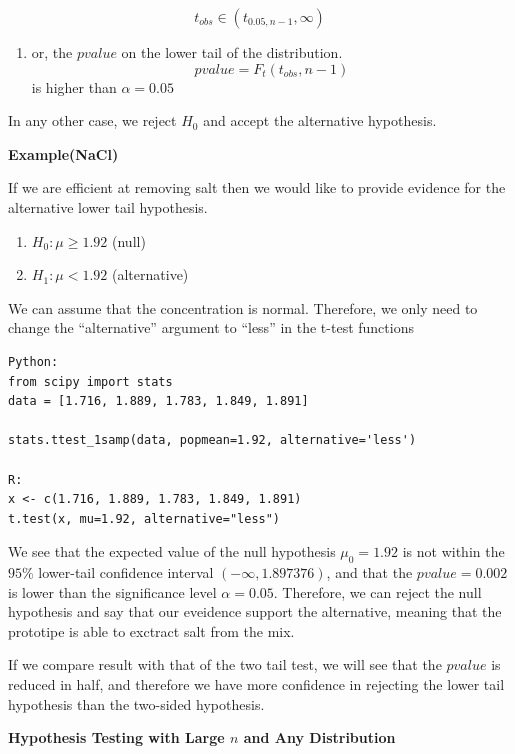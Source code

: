 \documentclass[
]{book}
\providecommand{\tightlist}{%
  \setlength{\itemsep}{0pt}\setlength{\parskip}{0pt}}
\begin{document}
\[t_{obs}\in (t_{0.05,n-1}, \infty)\]

\begin{enumerate}
\def\labelenumi{\arabic{enumi}.}
\setcounter{enumi}{2}
\tightlist
\item
  or, the \(pvalue\) on the lower tail of the distribution.\\
  \[pvalue=F_t(t_{obs},n-1)\]
  is higher than \(\alpha=0.05\)
\end{enumerate}

In any other case, we reject \(H_0\) and accept the alternative hypothesis.

\textbf{Example(NaCl)}

If we are efficient at removing salt then we would like to provide evidence for the alternative lower tail hypothesis.

\begin{enumerate}
\def\labelenumi{\alph{enumi}.}
\tightlist
\item
  \(H_0:\mu \geq 1.92\) (null)
\item
  \(H_1:\mu < 1.92\) (alternative)
\end{enumerate}

We can assume that the concentration is normal. Therefore, we only need to change the ``alternative'' argument to ``less'' in the t-test functions

\begin{verbatim}
Python:
from scipy import stats
data = [1.716, 1.889, 1.783, 1.849, 1.891]

stats.ttest_1samp(data, popmean=1.92, alternative='less')

R:
x <- c(1.716, 1.889, 1.783, 1.849, 1.891)
t.test(x, mu=1.92, alternative="less")
\end{verbatim}

We see that the expected value of the null hypothesis \(\mu_0=1.92\) is not within the \(95\%\) lower-tail confidence interval \((-\infty, 1.897376)\), and that the \(pvalue=0.002\) is lower than the significance level \(\alpha=0.05\). Therefore, we can reject the null hypothesis and say that our eveidence support the alternative, meaning that the prototipe is able to exctract salt from the mix.

If we compare result with that of the two tail test, we will see that the \(pvalue\) is reduced in half, and therefore we have more confidence in rejecting the lower tail hypothesis than the two-sided hypothesis.

\textbf{Hypothesis Testing with Large \(n\) and Any Distribution}
\end{document}
